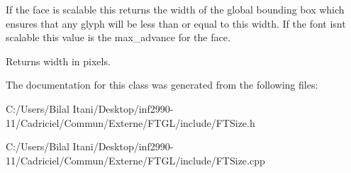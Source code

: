 If the face is scalable this returns the width of the global bounding box which ensures that any glyph will be less than or equal to this width. If the font isn\textquotesingle{}t scalable this value is the max\+\_\+advance for the face.

\begin{DoxyReturn}{Returns}
width in pixels. 
\end{DoxyReturn}


The documentation for this class was generated from the following files\+:\begin{DoxyCompactItemize}
\item 
C\+:/\+Users/\+Bilal Itani/\+Desktop/inf2990-\/11/\+Cadriciel/\+Commun/\+Externe/\+F\+T\+G\+L/include/F\+T\+Size.\+h\item 
C\+:/\+Users/\+Bilal Itani/\+Desktop/inf2990-\/11/\+Cadriciel/\+Commun/\+Externe/\+F\+T\+G\+L/include/F\+T\+Size.\+cpp\end{DoxyCompactItemize}
